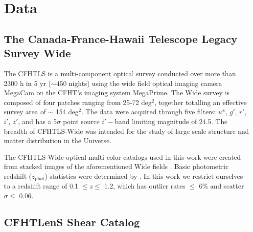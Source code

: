 
\section{Data}
\label{data}


\subsection{The Canada-France-Hawaii Telescope Legacy Survey Wide}

The \acf{CFHTLS} is a multi-component optical survey conducted over more than 2300 h in 5 yr ($\sim450$ nights) using the wide field optical imaging camera MegaCam on the \ac{CFHT}'s imaging system MegaPrime. The Wide survey is composed of four patches ranging from 25-72 deg$^2$, together totalling an effective survey area of $\sim$ 154 deg$^2$. The data were acquired through five filters: $u$*, $g'$, $r'$, $i'$, $z'$, and has a 5$\sigma$ point source $i'-$band limiting magnitude of 24.5. The breadth of \ac{CFHTLS}-Wide was intended for the study of large scale structure and matter distribution in the Universe.

The \ac{CFHTLS}-Wide optical multi-color catalogs used in this work were created from stacked images of the aforementioned Wide fields \citep[see][for details on the data processing and multi-color catalog creation]{Erben09, Hildebrandt09a, Hildebrandt12, Erben13}. Basic photometric redshift ($z_{\mathrm{phot}}$) statistics were determined by \citet{Hildebrandt12}. In this work we restrict ourselves to a redshift range of 0.1 $\leq z \leq$ 1.2, which has outlier rates $\leq$ 6\% and scatter $\sigma \leq$ 0.06.


\subsection{\ac{CFHTLenS} Shear Catalog}

